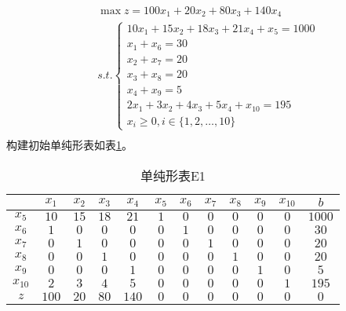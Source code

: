 \begin{solution}
    \begin{align*}
        &\max z = 100x_1 + 20x_2 + 80x_3 + 140x_4\\
        &s.t. \begin{cases}
            10x_1 + 15x_2 + 18x_3 + 21x_4 + x_5 = 1000\\
            x_1 + x_6 = 30\\
            x_2 + x_7 = 20\\
            x_3 + x_8 = 20\\
            x_4 + x_9 = 5\\
            2x_1 + 3x_2 + 4x_3 + 5x_4 + x_{10} = 195\\
            x_i \ge 0, i \in \{1,2,\ldots, 10\}
       \end{cases}\\
     \end{align*}
     构建初始单纯形表如表\ref{te1}。
      \begin{table}[!h]
         \centering
         \caption{单纯形表E1}
         \label{te1}
         \begin{tabular}{c|ccccccccccc} 
         \toprule
                  &$x_1$  &$x_2$  &$x_3$  &$x_4$  &$x_5$  &$x_6$  &$x_7$  &$x_8$  &$x_9$  &$x_{10}$ &$b$    \\\hline
         $x_5$    &$10$   &$15$   &$18$   &$21$   &$1$    &$0$    &$0$    &$0$    &$0$    &$0$      &$1000$ \\
         $x_6$    &$1$    &$0$    &$0$    &$0$    &$0$    &$1$    &$0$    &$0$    &$0$    &$0$      &$30$   \\
         $x_7$    &$0$    &$1$    &$0$    &$0$    &$0$    &$0$    &$1$    &$0$    &$0$    &$0$      &$20$   \\
         $x_8$    &$0$    &$0$    &$1$    &$0$    &$0$    &$0$    &$0$    &$1$    &$0$    &$0$      &$20$   \\
         $x_9$    &$0$    &$0$    &$0$    &$1$    &$0$    &$0$    &$0$    &$0$    &$1$    &$0$      &$5$    \\
         $x_{10}$ &$2$    &$3$    &$4$    &$5$    &$0$    &$0$    &$0$    &$0$    &$0$    &$1$      &$195$  \\
         $z$      &$100$  &$20$   &$80$   &$140$  &$0$    &$0$    &$0$    &$0$    &$0$    &$0$      &$0$    \\
         \bottomrule
         \end{tabular}
      \end{table}


\end{solution}
